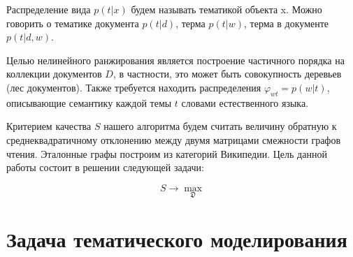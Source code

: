 \documentclass[12pt,twoside]{article}
\begin{document}
	Распределение вида $p(t|x)$ будем называть тематикой объекта x. Можно говорить о тематике документа $p(t|d)$, терма $p(t|w)$, терма в документе $p(t|d, w)$.
	
	Целью нелинейного ранжирования  является построение частичного порядка на коллекции документов $D$, в частности, это может быть совокупность деревьев (лес документов). Также требуется находить распределения $\varphi_{wt}= p(w|t)$, описывающие семантику каждой темы $t$ словами естественного языка.
	
	Критерием качества $S$ нашего алгоритма будем считать величину обратную к среднеквадратичному отклонению между двумя матрицами смежности графов чтения. Эталонные графы построим из категорий Википедии. Цель данной работы состоит в решении следующей задачи:
	
	\begin{equation}
	S \rightarrow \max_{\mathfrak{D}}
	\end{equation}
	
	\section{Задача тематического моделирования}
	
	
	
	
	
	
	
	
	
	
\end{document}
